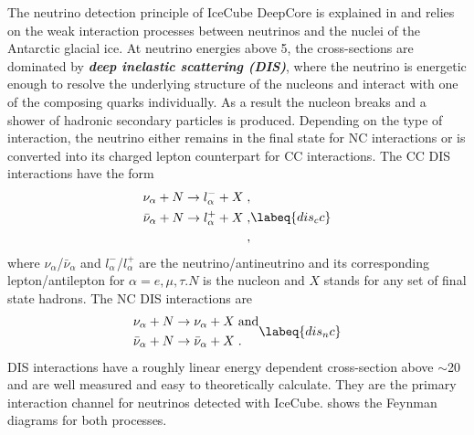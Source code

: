 The neutrino detection principle of IceCube DeepCore is explained in  and relies on the weak interaction processes between neutrinos and the nuclei of the Antarctic glacial ice. At neutrino energies above \SI{5}{\gev}, the cross-sections are dominated by \textbf{\textit{deep inelastic scattering (DIS)}}, where the neutrino is energetic enough to resolve the underlying structure of the nucleons and interact with one of the composing quarks individually. As a result the nucleon breaks and a shower of hadronic secondary particles is produced. Depending on the type of interaction, the neutrino either remains in the final state for NC interactions or is converted into its charged lepton counterpart for CC interactions. The CC DIS interactions have the form
\begin{equation}
    \begin{split}
        \nu_\alpha + N \rightarrow l^-_\alpha + X \;, \\
        \bar{\nu}_\alpha + N \rightarrow l^+_\alpha + X \;, \\
        \;,
    \end{split}
    \labeq{dis_cc}
\end{equation}
where $\nu_\alpha$/$\bar{\nu}_\alpha$ and $l^-_\alpha$/$l^+_\alpha$ are the neutrino/antineutrino and its corresponding lepton/antilepton for $\alpha=e,\mu,\tau$.$N$ is the nucleon and $X$ stands for any set of final state hadrons. The NC DIS interactions are
\begin{equation}
    \begin{split}
    \nu_\alpha + N & \rightarrow \nu_\alpha + X \; \rm{and} \\
    \bar{\nu}_\alpha + N & \rightarrow \bar{\nu}_\alpha + X \;. \\
    \end{split}
    \labeq{dis_nc}
\end{equation}
DIS interactions have a roughly linear energy dependent cross-section above $\sim$\SI{20}{\gev} and are well measured and easy to theoretically calculate. They are the primary interaction channel for neutrinos detected with IceCube.  shows the Feynman diagrams for both processes.

